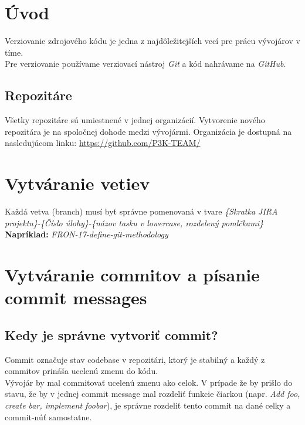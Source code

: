 \documentclass{article}
\begin{document}
    

    \section*{Úvod}
        \textnormal{%
        Verziovanie zdrojového kódu je jedna z najdôležitejších vecí pre prácu vývojárov v tíme. \\
        Pre verziovanie používame verziovací nástroj \emph{Git} a kód nahrávame na \emph{GitHub}.
        }

        \subsection*{Repozitáre}

            \textnormal{%
            Všetky repozitáre sú umiestnené v jednej organizácií. Vytvorenie nového repozitára je na spoločnej dohode medzi vývojármi.
            Organizácia je dostupná na nasledujúcom linku: \href{https://github.com/P3K-TEAM/}{https://github.com/P3K-TEAM/}
            }

    \section*{Vytváranie vetiev}

        \textnormal{%
        Každá vetva (branch) musí byť správne pomenovaná v tvare \emph{\{Skratka JIRA projektu\}-\{Číslo úlohy\}-\{názov tasku v lowercase, rozdelený pomlčkami\}}
        \bigskip
        \textbf{Napríklad:} \emph{FRON-17-define-git-methodology}
        }

    \section*{Vytváranie commitov a písanie commit messages}

        \vspace*{.25cm}
        \subsection*{Kedy je správne vytvoriť commit?}

            \textnormal{%
            Commit označuje stav codebase v repozitári, ktorý je stabilný a každý z commitov prináša ucelenú zmenu do kódu. \\
            Vývojár by mal commitovať ucelenú zmenu ako celok. V prípade že by prišlo do stavu, že by v jednej commit message mal rozdeliť funkcie čiarkou (napr. \emph{Add foo, create bar, implement foobar}), je správne rozdeliť tento commit na dané celky a commit-núť samostatne. \\
            }
\end{document}

